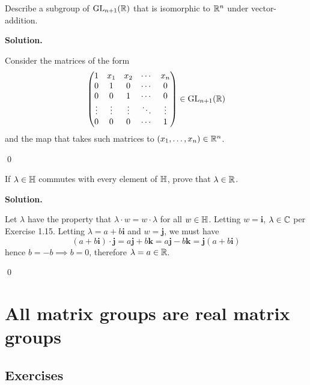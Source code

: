 \documentclass[12pt]{book}
\theoremstyle{definition}
\newenvironment{solution}
{%
  \par\noindent\textbf{Solution.}\quad
}
{%
  \qed\par
}
\begin{document}
\begin{taggedexercise}[\textcolor{green}{Complete}]
  Describe a subgroup of $\mathrm{GL}_{n+1}(\mathbb{R})$ that is isomorphic to $\mathbb{R}^n$ under vector-addition.
\end{taggedexercise}

\begin{solution}
  Consider the matrices of the form 
  \[
  \begin{pmatrix}
  1      & x_1    & x_2    & \cdots & x_n \\
  0      & 1      & 0      & \cdots & 0   \\
  0      & 0      & 1      & \cdots & 0   \\
  \vdots & \vdots & \vdots & \ddots & \vdots \\
  0      & 0      & 0      & \cdots & 1
  \end{pmatrix} \in \mathrm{GL}_{n+1}(\mathbb{R})
  \]
  and the map that takes such matrices to $(x_1, \dots , x_n) \in \mathbb{R}^n$.

\end{solution}

\begin{taggedexercise}[\textcolor{green}{Complete}]
  If $\lambda \in \mathbb{H}$ commutes with every element of $\mathbb{H}$, prove that $\lambda \in \mathbb{R}$.
\end{taggedexercise}

\begin{solution}
  Let $\lambda$ have the property that $\lambda \cdot w = w \cdot \lambda$ for all $w \in \mathbb{H}$.
  Letting $w = \mathbf{i}$, $\lambda \in \mathbb{C}$ per Exercise 1.15.
  Letting $\lambda = a+b\mathbf{i}$ and $w = \mathbf{j}$, we must have
  \[
    (a+b\mathbf{i}) \cdot \mathbf{j} = a\mathbf{j} + b\mathbf{k} = a\mathbf{j} - b\mathbf{k} = \mathbf{j}(a+b \mathbf{i})
  \]
  hence $b = -b \implies b = 0$, therefore $\lambda = a \in \mathbb{R}$.
  
\end{solution}

\chapter{All matrix groups are real matrix groups}
\section{Exercises}
\end{document}
